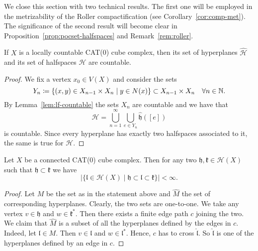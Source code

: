 We close this section with two technical results. The first one will be employed in the metrizability of the Roller compactification (see Corollary~\ref{cor:comp-met}). The significance of the second result will become clear in Proposition~\ref{prop:pocset-halfspaces} and Remark~\ref{rem:roller}.

\begin{cor}
  \label{cor:halfspace-countable}
  If \(X\) is a locally countable CAT(0) cube complex, then its set of hyperplanes \(\mathcal{\hat H}\) and its set of halfspaces \(\mathcal{H}\) are countable.
\end{cor}

\begin{proof}
  We fix a vertex \(x_0 \in V(X)\) and consider the sets
  \[
    Y_n \coloneqq \{(x,y) \in X_{n-1} \times X_{n} \mid y \in N(x)\} \subset X_{n-1} \times X_n \quad \forall n \in \mathbb{N}.
  \]
  By Lemma~\ref{lem:lf-countable} the sets \(X_n\) are countable and we have that
  \[
    \mathcal{\hat H} = \bigcup_{n=1}^\infty \bigcup_{e \in Y_n} \mathfrak{\hat h}([e])
  \]
  is countable. Since every hyperplane has exactly two halfspaces associated to it, the same is true for \(\mathcal{H}\).
\end{proof}

\begin{lemma}
  \label{lem:finite-interval}
  Let \(X\) be a connected CAT(0) cube complex. Then for any two \(\mathfrak{h,k} \in \mathcal{H}(X)\) such that \(\mathfrak{h} \subset \mathfrak{k}\) we have
  \[
    |\{\mathfrak{l} \in \mathcal{H}(X) \mid \mathfrak{h} \subset \mathfrak{l} \subset \mathfrak{k}\}| < \infty.
  \]
\end{lemma}

\begin{proof}
  Let \(M\) be the set as in the statement above and \(\hat M\) the set of corresponding hyperplanes. Clearly, the two sets are one-to-one. We take any vertex \(v \in \mathfrak{h}\)  and \(w \in \mathfrak{k}^\ast\). Then there exists a finite edge path \(c\) joining the two. We claim that \(\hat M\) is a subset of all the hyperplanes defined by the edges in \(c\). Indeed, let \(\mathfrak{l} \in M\). Then \(v \in \mathfrak{l}\) and \(w \in \mathfrak{l}^\ast\). Hence, \(c\) has to cross \(\mathfrak{\hat l}\). So \(\mathfrak{\hat l}\) is one of the hyperplanes defined by an edge in \(c\).
\end{proof}

